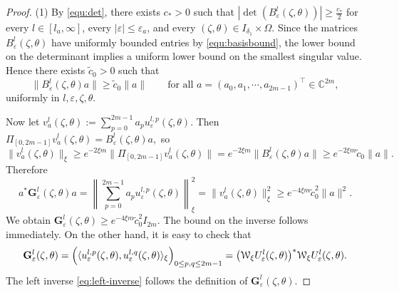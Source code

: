 \documentclass[reqno,11pt]{amsart}
\newcommand{\C}{{\mathbb C}}
\begin{document}
\begin{proof}
(1)
By \eqref{equ:det},
there exists $c_*>0$ such that
$
\left|\det(B_\varepsilon^l(\zeta,\theta))\right|\ge \frac{c_*}{2}
$
for every $l\in[l_a,\infty]$, every $|\varepsilon|\le \varepsilon_a$, and every
$(\zeta,\theta)\in{I_{\delta_1}}\times \Omega$.
Since the matrices
$
B_\varepsilon^l(\zeta,\theta)
$
have uniformly bounded entries by \eqref{equ:basisbound}, the lower bound on the determinant implies a uniform
lower bound on the smallest singular value. Hence there exists $\tilde c_0>0$ such that
$$
\|B_\varepsilon^l(\zeta,\theta)a\|\ge \tilde c_0 \|a\|
\qquad
\text{for all }a=(a_0,a_1,\cdots,a_{2m-1})^{\!\top}\in\C^{2m},
$$
uniformly in $l,\varepsilon,\zeta,\theta$.

Now let
$
v_a^l(\zeta,\theta):=\sum_{p=0}^{2m-1}a_pu_\varepsilon^{l,p}(\zeta,\theta).
$
Then
$
\Pi_{[0,2m-1]}v_a^l(\zeta,\theta)=B_\varepsilon^l(\zeta,\theta)a,
$
so
$$
\|v_a^l(\zeta,\theta)\|_\xi
\ge e^{-2\xi m}
\|\Pi_{[0,2m-1]}v_a^l(\zeta,\theta)\|
= e^{-2\xi m}\|B_\varepsilon^l(\zeta,\theta)a\|\ge e^{-2\xi m}\tilde c_0\|a\|.
$$
Therefore
$$
a^*\mathbf G_\varepsilon^l(\zeta,\theta)a
=\left\|\sum_{p=0}^{2m-1}a_pu_\varepsilon^{l,p}(\zeta,\theta)\right\|_\xi^2
=\|v_a^l(\zeta,\theta)\|_\xi^2
\ge e^{-4\xi m}\tilde c_0^2\|a\|^2.
$$
 We obtain
$
\mathbf G_\varepsilon^l(\zeta,\theta)\ge  e^{-4\xi m}\tilde c_0^2 I_{2m}.
$
The bound on the inverse follows immediately.
On the other hand,
it is easy to  check that 
\begin{equation*}
\mathbf{G}^{l}_{\varepsilon}(\zeta,\theta) =\Bigl( \langle u^{l,p}_{\varepsilon}(\zeta,\theta), u^{l,q}_{\varepsilon}(\zeta,\theta) \rangle_\xi \Bigr)_{0\le p,q\le 2m-1}=
\bigl(\mathcal W_\xi U_\varepsilon^l(\zeta,\theta)\bigr)^*
\mathcal W_\xi U_\varepsilon^l(\zeta,\theta).
\end{equation*}
The left inverse \eqref{eq:left-inverse}  follows the definition of $\mathbf G_\varepsilon^l(\zeta,\theta)$.



\end{proof}
\end{document}
